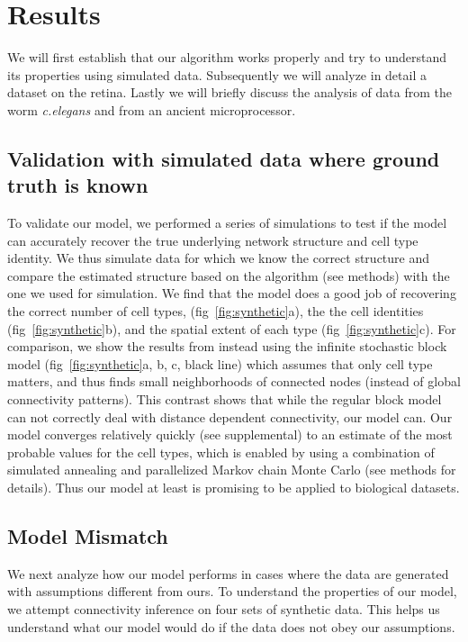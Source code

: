 \documentclass{article}
\begin{document}
{\section*{Results}
We will first establish that our algorithm works properly and try to
understand its properties using simulated data. Subsequently we will
analyze in detail a dataset on the retina. Lastly we will briefly
discuss the analysis of data from the worm \textit{c.elegans} and from
an ancient microprocessor.


\subsection*{Validation with simulated data where ground truth is known}
To validate our model, we performed a series of simulations to test if
the model can accurately recover the true underlying network structure
and cell type identity.  We thus simulate data for which we know the
correct structure and compare the estimated structure based on the
algorithm (see methods) with the one we used for simulation. We find
that the model does a good job of recovering the correct number of
cell types, (fig~\ref{fig:synthetic}a), the the cell identities
(fig~\ref{fig:synthetic}b), and the spatial extent of each type
(fig~\ref{fig:synthetic}c).  For comparison, we show the results from
instead using the infinite stochastic block model
(fig~\ref{fig:synthetic}a, b, c, black line) which assumes that only
cell type matters, and thus finds small neighborhoods of connected
nodes (instead of global connectivity patterns). This contrast shows
that while the regular block model can not correctly deal with
distance dependent connectivity, our model can. Our model converges
relatively quickly (see supplemental) to an estimate of the most
probable values for the cell types, which is enabled by using a
combination of simulated annealing and parallelized Markov chain Monte
Carlo (see methods for details). Thus our model at least is promising
to be applied to biological datasets.



\subsection*{Model Mismatch}
We next analyze how our model performs in cases where the data are
generated with assumptions different from ours.  To understand the
properties of our model, we attempt connectivity inference on four
sets of synthetic data. This helps us understand what our model would
do if the data does not obey our assumptions.

}
\end{document}
